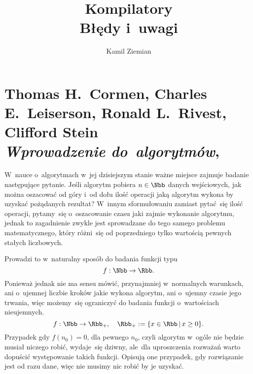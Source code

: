 \documentclass[a4paper,11pt]{article}
\title{Kompilatory \\
  {\Large Błędy i~uwagi}}
\author{Kamil Ziemian}
\numberwithin{equation}{section}
\begin{document}





\maketitle  %





\section{Thomas H.~Cormen, Charles E.~Leiserson, Ronald L.~Rivest, Clifford Stein \\
  \textit{Wprowadzenie do~algorytmów},
  \cite{CormenAtAlWprowadzenieDoAlgorytmow2022}}

\vspace{0em}



\vspace{0em}


\noindent W~nauce o~algorytmach w~jej dzisiejszym stanie ważne miejsce
zajmuje badanie następujące pytanie. Jeśli algorytm pobiera $n \in \Nbb$
danych wejściowych, jak można oszacować od góry i~od dołu ilość operacji
jaką algorytm wykona by uzyskać pożądanych rezultat? W~innym sformułowaniu
zamiast pytać~się ilość operacji, pytamy~się o~oszacowanie czasu jaki zajmie
wykonanie algorytmu, jednak to zagadnienie zwykle jest sprowadzane do tego
samego problemu matematycznego, który różni~się od poprzedniego tylko
wartością pewnych stałych liczbowych.

Prowadzi to w~naturalny sposób do badania funkcji typu
\begin{equation}
  \label{eq:CormenAtAl-WprowadzenieDoAlgorytmow-01}
  f : \Nbb \to \Rbb.
\end{equation}
Ponieważ jednak nie ma sensu mówić, przynajmniej w~normalnych warunkach, ani
o~ujemnej liczbie kroków jakie wykona algorytm, ani o~ujemny czasie jego
trwania, więc możemy~się ograniczyć do badania funkcji o~wartościach
nieujemnych.
\begin{equation}
  \label{eq:CormenAtAl-WprowadzenieDoAlgorytmow-02}
  f : \Nbb \to \Rbb_{ + }, \quad
  \Rbb_{ + } := \{ x \in \Rbb \, | \, x \geq 0 \}.
\end{equation}
Przypadek gdy $f( n_{ 0 } ) = 0$, dla pewnego $n_{ 0 }$, czyli algorytm
w~ogóle nie będzie musiał niczego robić, wydaje~się dziwny, ale~dla
uproszczenia rozważań warto dopuścić występowanie takich funkcji. Opisują
one przypadek, gdy rozwiązanie jest od razu dane, więc nie musimy nic robić
by je uzyskać.
\end{document}
